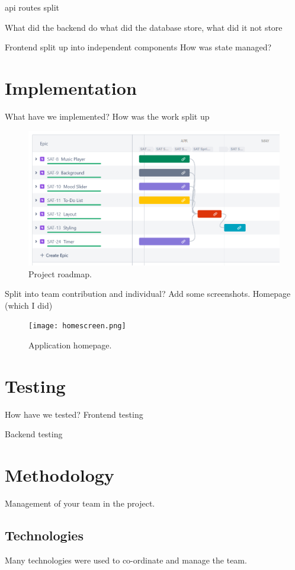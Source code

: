 \documentclass[conference]{IEEEtran}
\begin{document}
api routes split

What did the backend do
what did the database store, what did it not store

Frontend split up into independent components
How was state managed?

\section{Implementation}
What have we implemented? 
How was the work split up

\begin{figure}[htbp]
\centerline{\includegraphics[width = \linewidth]{project-roadmap.png}}
\caption{Project roadmap.}
\label{fig}
\end{figure}

Split into team contribution and individual?
Add some screenshots. Homepage (which I did)

\begin{figure}[htbp]
\centerline{\texttt{[image: homescreen.png]}}
\caption{Application homepage.}
\label{fig}
\end{figure}

\section{Testing}
How have we tested?
Frontend testing

Backend testing


\section{Methodology}
Management of your team in the project.

\subsection{Technologies}
Many technologies were used to co-ordinate and manage the team.
\end{document}
